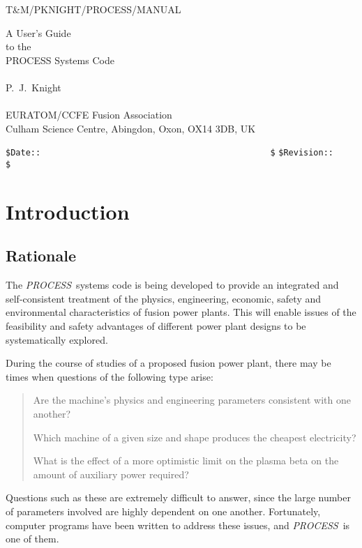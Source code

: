 \documentclass[11pt,a4paper]{report}
\newcommand{\PS}{\mbox{\it PROCESS\/ }}
\newcommand{\setheader}[1]
 {\markright{\rlap{\lower0.8ex\hbox to\textwidth{\hrulefill}}{\bf#1}}}
\newcommand{\mychapter}[1]{\small\normalsize
 \setcounter{footnote}{0}
 \chapter{#1}
 \pagestyle{myheadings}
 \setheader{Chapter \thechapter\hspace{0.8em}#1}}
\begin{document}
\footnotesize
\hfill T\&M/PKNIGHT/PROCESS/MANUAL

\vspace*{4cm}
\begin{center}
\Huge A User's Guide\\ to the \\ PROCESS Systems Code\\
~\\ \LARGE P.\ J.\ Knight\\
~\\ \Large EURATOM/CCFE Fusion Association\\
Culham Science Centre, Abingdon, Oxon, OX14 3DB, UK
\end{center}

\vfill
\footnotesize
\verb?$Date::                                              $?
\hfill
\verb?$Revision::     $?

\normalsize
\tableofcontents

\mychapter{Introduction}
\label{chap:intro}

\section{Rationale}

The \PS systems code is being developed to provide an integrated and
self-consistent treatment of the physics, engineering, economic, safety and
environmental characteristics of fusion power plants. This will enable issues
of the feasibility and safety advantages of different power plant designs to
be systematically explored.

During the course of studies of a proposed fusion power plant, there may be
times when questions of the following type arise:
\begin{quote}
Are the machine's physics and engineering parameters consistent with one
another?

Which machine of a given size and shape produces the cheapest electricity?

What is the effect of a more optimistic limit on the plasma beta on the amount
of auxiliary power required?
\end{quote}

Questions such as these are extremely difficult to answer, since the large
number of parameters involved are highly dependent on one another.
Fortunately, computer programs have been written to address these issues, and
\PS is one of them.
\end{document}
